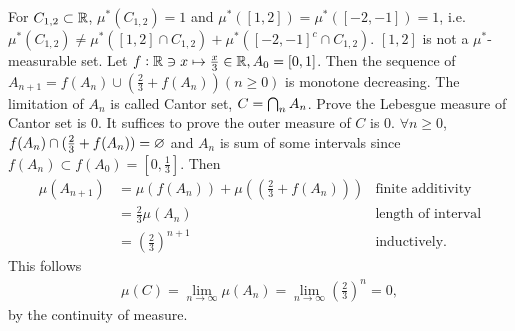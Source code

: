 \begin{enumerate}
		For $C_{1,2}\subset \mathbb{R}$, $\mu^*(C_{1,2})=1$ and $\mu^*([1,2])=\mu^*([-2,-1])=1$, i.e.$\mu^*(C_{1,2})\neq \mu^*([1,2]\cap C_{1,2})+\mu^*([-2,-1]^c\cap C_{1,2})$. $[1,2]$ is not a $\mu^*$-measurable set.
		\prob
		Let $f:\mathbb{R} \ni x\mapsto \frac{x}{3}\in \mathbb{R}, A_0=[0,1]$. Then the sequence of $A_{n+1}=f(A_n)\cup (\frac{2}{3}+f(A_n))(n\geq 0)$ is monotone decreasing. The limitation of $A_n$ is called Cantor set, $C=\textstyle\bigcap_n A_n$. Prove the Lebesgue measure of Cantor set is 0.
		\soln
		It suffices to prove the outer measure of $C$ is 0. $\forall n\geq 0$, $f(A_n) \cap (\frac{2}{3}+f(A_n))=\varnothing$ and $A_n$ is sum of some intervals since $f(A_n)\subset f(A_0)=[0,\frac{1}{3}]$. Then
	\begin{align*}
		\mu(A_{n+1}) & = \mu(f(A_n))+ \mu((\frac{2}{3}+f(A_n))) & \text{finite additivity}
		\\ & = \frac{2}{3}\mu(A_n) & \text{length of interval}
		\\ & = (\frac{2}{3})^{n+1} & \text{inductively}.
	\end{align*}
	This follows
	\begin{align*}
		\mu(C)=\lim_{n\to \infty}\mu(A_n)=\lim_{n\to \infty}(\frac{2}{3})^n=0,
	\end{align*}
	by the continuity of measure.


\end{enumerate}
